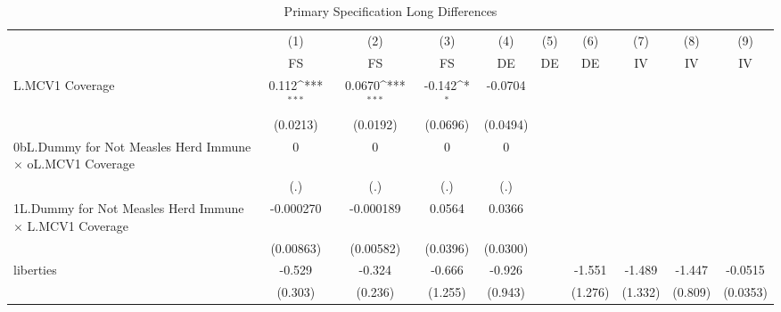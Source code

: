 \begin{table}[htbp]\centering
\def\sym#1{\ifmmode^{#1}\else\(^{#1}\)\fi}
\caption{Primary Specification Long Differences}
\begin{tabular}{l*{9}{c}}
\toprule
                &\multicolumn{1}{c}{(1)}&\multicolumn{1}{c}{(2)}&\multicolumn{1}{c}{(3)}&\multicolumn{1}{c}{(4)}&\multicolumn{1}{c}{(5)}&\multicolumn{1}{c}{(6)}&\multicolumn{1}{c}{(7)}&\multicolumn{1}{c}{(8)}&\multicolumn{1}{c}{(9)}\\
                &\multicolumn{1}{c}{FS}&\multicolumn{1}{c}{FS}&\multicolumn{1}{c}{FS}&\multicolumn{1}{c}{DE}&\multicolumn{1}{c}{DE}&\multicolumn{1}{c}{DE}&\multicolumn{1}{c}{IV}&\multicolumn{1}{c}{IV}&\multicolumn{1}{c}{IV}\\
\midrule
L.MCV1 Coverage &    0.112\sym{***}&   0.0670\sym{***}&   -0.142\sym{*}  &  -0.0704         &                  &                  &                  &                  &                  \\
                & (0.0213)         & (0.0192)         & (0.0696)         & (0.0494)         &                  &                  &                  &                  &                  \\
\addlinespace
0bL.Dummy for Not Measles Herd Immune $\times$ oL.MCV1 Coverage&        0         &        0         &        0         &        0         &                  &                  &                  &                  &                  \\
                &      (.)         &      (.)         &      (.)         &      (.)         &                  &                  &                  &                  &                  \\
\addlinespace
1L.Dummy for Not Measles Herd Immune $\times$ L.MCV1 Coverage&-0.000270         &-0.000189         &   0.0564         &   0.0366         &                  &                  &                  &                  &                  \\
                &(0.00863)         &(0.00582)         & (0.0396)         & (0.0300)         &                  &                  &                  &                  &                  \\
\addlinespace
liberties       &   -0.529         &   -0.324         &   -0.666         &   -0.926         &                  &   -1.551         &   -1.489         &   -1.447         &  -0.0515         \\
                &  (0.303)         &  (0.236)         &  (1.255)         &  (0.943)         &                  &  (1.276)         &  (1.332)         &  (0.809)         & (0.0353)         \\

\end{tabular}
\end{table}
